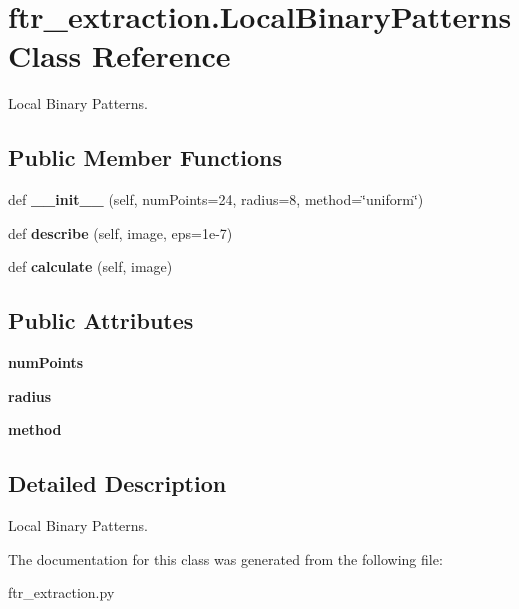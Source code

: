 \hypertarget{classftr__extraction_1_1_local_binary_patterns}{}\section{ftr\+\_\+extraction.\+Local\+Binary\+Patterns Class Reference}
\label{classftr__extraction_1_1_local_binary_patterns}


Local Binary Patterns.  


\subsection*{Public Member Functions}
\begin{DoxyCompactItemize}
\item 
\mbox{\label{classftr__extraction_1_1_local_binary_patterns_ab834cf1291005ba9803e83c88a2fbbcf}} 
def {\bfseries \+\_\+\+\_\+init\+\_\+\+\_\+} (self, num\+Points=24, radius=8, method=\char`\"{}uniform\char`\"{})
\item 
\mbox{\label{classftr__extraction_1_1_local_binary_patterns_a06de8ef162cbb77bb5fa1c58017985ad}} 
def {\bfseries describe} (self, image, eps=1e-\/7)
\item 
\mbox{\label{classftr__extraction_1_1_local_binary_patterns_ac973f60455bea1640b5cb41b54783e66}} 
def {\bfseries calculate} (self, image)
\end{DoxyCompactItemize}
\subsection*{Public Attributes}
\begin{DoxyCompactItemize}
\item 
\mbox{\label{classftr__extraction_1_1_local_binary_patterns_a5f32a0980c300503a2419974cc23a015}} 
{\bfseries num\+Points}
\item 
\mbox{\label{classftr__extraction_1_1_local_binary_patterns_ad5ed628e747c2ba6e63f4ae5fbc6995e}} 
{\bfseries radius}
\item 
\mbox{\label{classftr__extraction_1_1_local_binary_patterns_ac243ae4631c9a402c63f6e3ae5ef6bb1}} 
{\bfseries method}
\end{DoxyCompactItemize}


\subsection{Detailed Description}
Local Binary Patterns. 

The documentation for this class was generated from the following file\+:\begin{DoxyCompactItemize}
\item 
ftr\+\_\+extraction.\+py\end{DoxyCompactItemize}
